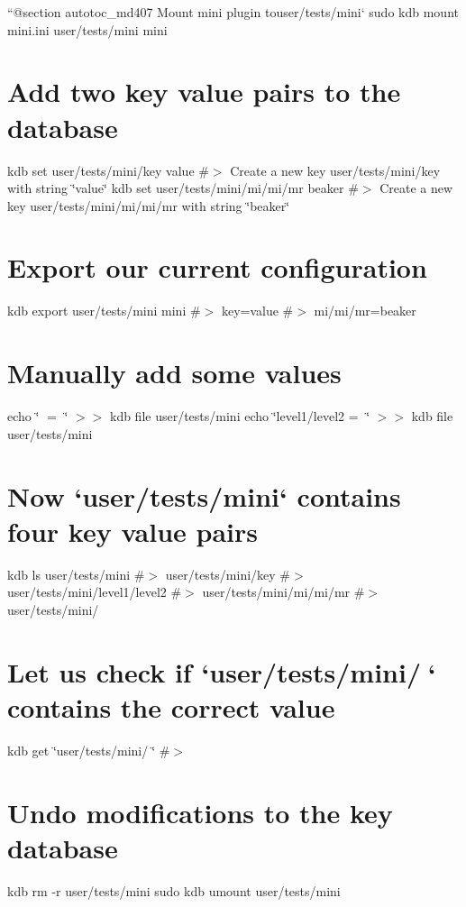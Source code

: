``{\ttfamily  @section autotoc\+\_\+md407 Mount mini plugin to}user/tests/mini` sudo kdb mount mini.\+ini user/tests/mini mini\hypertarget{autotoc_md404_autotoc_md408}{}\section{Add two key value pairs to the database}\label{autotoc_md404_autotoc_md408}
kdb set user/tests/mini/key value \#$>$ Create a new key user/tests/mini/key with string \char`\"{}value\char`\"{} kdb set user/tests/mini/mi/mi/mr beaker \#$>$ Create a new key user/tests/mini/mi/mi/mr with string \char`\"{}beaker\char`\"{}\hypertarget{autotoc_md404_autotoc_md409}{}\section{Export our current configuration}\label{autotoc_md404_autotoc_md409}
kdb export user/tests/mini mini \#$>$ key=value \#$>$ mi/mi/mr=beaker\hypertarget{autotoc_md404_autotoc_md410}{}\section{Manually add some values}\label{autotoc_md404_autotoc_md410}
echo \char`\"{}🔑 = 🦄\char`\"{} $>$$>$ {\ttfamily kdb file user/tests/mini} echo \char`\"{}level1/level2 = 👾\char`\"{} $>$$>$ {\ttfamily kdb file user/tests/mini}\hypertarget{autotoc_md404_autotoc_md411}{}\section{Now `user/tests/mini` contains four key value pairs}\label{autotoc_md404_autotoc_md411}
kdb ls user/tests/mini \#$>$ user/tests/mini/key \#$>$ user/tests/mini/level1/level2 \#$>$ user/tests/mini/mi/mi/mr \#$>$ user/tests/mini/🔑\hypertarget{autotoc_md404_autotoc_md412}{}\section{Let us check if `user/tests/mini/🔑` contains the correct value}\label{autotoc_md404_autotoc_md412}
kdb get \char`\"{}user/tests/mini/🔑\char`\"{} \#$>$ 🦄\hypertarget{autotoc_md404_autotoc_md413}{}\section{Undo modifications to the key database}\label{autotoc_md404_autotoc_md413}
kdb rm -\/r user/tests/mini sudo kdb umount user/tests/mini 
